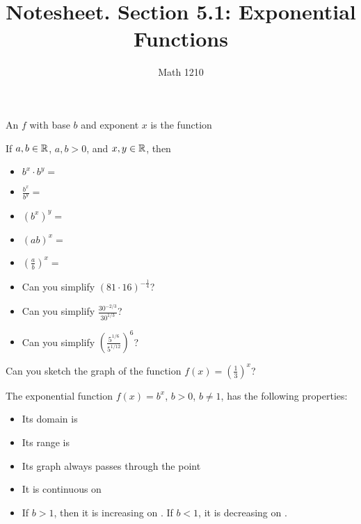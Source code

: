\documentclass[12pt, a4paper]{article}
\author{Math 1210}
\title{Notesheet. Section 5.1: Exponential Functions}
\date{}
\begin{document}
\maketitle
\nameline
\begin{defi}
  An  $f$ with base $b$ and exponent $x$ is the function
\end{defi}
\begin{thrm}
  If $a, b \in {\mathbb R}$, $a, b > 0$, and $x, y \in {\mathbb R}$, then
  \begin{itemize}
    \item $b^x \cdot b^y = $
    \item $\frac{b^x}{b^y} = $
    \item $(b^x)^y = $
    \item $(ab)^x = $
    \item $\left(\frac{a}{b}\right)^x = $
  \end{itemize}
\end{thrm}
\begin{ex}
  \mbox{}
  \begin{itemize}
    \item Can you simplify $(81 \cdot 16)^{-\frac{1}{4}}$?
    \item Can you simplify $\frac{30^{-2/3}}{30^{1/3}}$?
    \item Can you simplify $\left(\frac{5^{1/6}}{5^{1/12}}\right)^6$?

  \end{itemize}
\end{ex}
\begin{ex}
  Can you sketch the graph of the function $f(x) = \left(\frac{1}{3}\right)^x$?
\end{ex}
\vspace{-0.55in}
\begin{thrm}
  The exponential function $f(x) = b^x$, $b > 0$, $b \neq 1$, has the following properties:
  \begin{itemize}
    \item Its domain is
    \item Its range is
    \item Its graph always passes through the point
    \item It is continuous on
    \item If $b >1$, then it is increasing on \phantom{$(-\oo, \oo)$}.  If $b <1$, it is decreasing on \phantom{$(-\oo, \oo)$}.
  \end{itemize}
\end{thrm}
\end{document}
